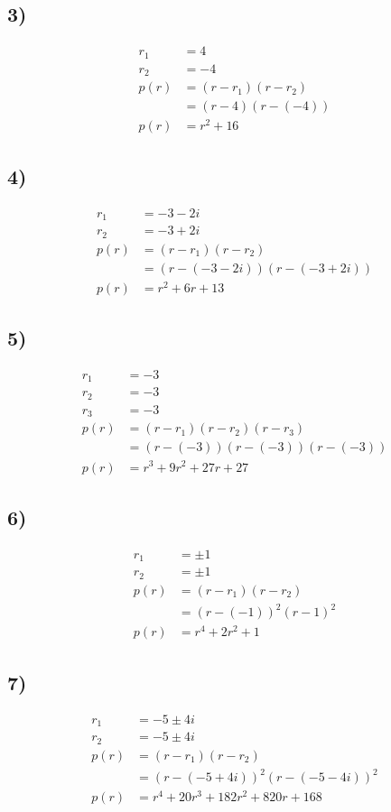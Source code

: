 \documentclass{article}
\begin{document}
\subsection{3)}
\begin{align*}
	r_1 & = 4 \\
	r_2 & = -4 \\
	p(r) & = (r - r_1)(r - r_2) \\
		 & = (r - 4)(r - (-4)) \\
	p(r) & = r^2 + 16
\end{align*}

\subsection{4)}
\begin{align*}
	r_1 & = -3 - 2i \\
	r_2 & = -3 + 2i \\
	p(r) & = (r - r_1)(r - r_2) \\
		 & = (r - (-3 - 2i))(r - (-3 + 2i)) \\
	p(r) & = r^2 + 6r + 13
\end{align*}

\subsection{5)}
\begin{align*}
	r_1 & = -3 \\
	r_2 & = -3 \\
	r_3 & = -3 \\
	p(r) & = (r - r_1)(r - r_2)(r - r_3) \\
		 & = (r - (-3))(r - (-3))(r - (-3)) \\
	p(r) & = r^3 + 9r^2 + 27r + 27
\end{align*}

\subsection{6)}
\begin{align*}
	r_1 & = \pm1 \\
	r_2 & = \pm1 \\
	p(r) & = (r - r_1)(r - r_2) \\
		 & = (r - (-1))^2(r - 1)^2 \\
	p(r) & = r^4 + 2r^2 + 1
\end{align*}

\subsection{7)}
\begin{align*}
	r_1 & = -5 \pm 4i \\
	r_2 & = -5 \pm 4i \\
	p(r) & = (r - r_1)(r - r_2) \\
		 & = (r - (-5 + 4i))^2(r - (-5 - 4i))^2 \\
	p(r) & = r^4 + 20r^3 + 182r^2 + 820r + 168
\end{align*}
\end{document}
